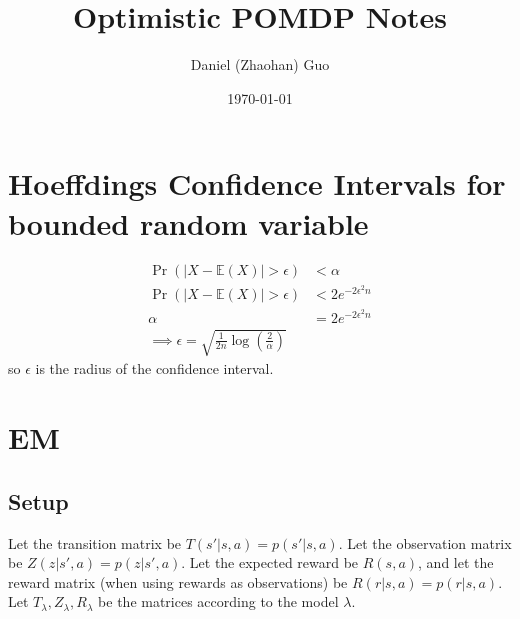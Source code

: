 \documentclass[10pt,english]{article}
\title{Optimistic POMDP Notes}
\author{Daniel (Zhaohan) Guo}
\date{\today}
\begin{document}
\maketitle

\section{Hoeffdings Confidence Intervals for bounded random variable}

\begin{align}
\Pr(|X-\mathbb{E}(X)| > \epsilon) &< \alpha \\
\Pr(|X-\mathbb{E}(X)| > \epsilon) &< 2e^{-2\epsilon^2n}\\
\alpha &= 2e^{-2\epsilon^2n}\\
\implies \epsilon = \sqrt{\frac{1}{2n}\log\left(\frac{2}{\alpha}\right)}
\end{align}
so $\epsilon$ is the radius of the confidence interval.

\section{EM}

\subsection{Setup}

Let the transition matrix be $T(s'|s,a) = p(s'|s,a)$. Let the observation matrix be $Z(z|s',a)=p(z|s',a)$. Let the expected reward be $R(s,a)$, and let the reward matrix (when using rewards as observations) be $R(r|s,a)=p(r|s,a)$. Let $T_{\lambda},Z_\lambda,R_\lambda$ be the matrices according to the model $\lambda$.
\end{document}
